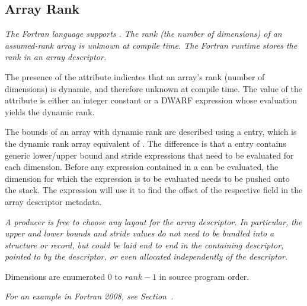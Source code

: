 \subsection{Array Rank}
\label{chap:DWATrank}
\textit{The Fortran language supports . The
  rank (the number of dimensions) of an assumed-rank array is unknown
  at compile time. The Fortran runtime stores the rank in an array
  descriptor.}

The presence of the
\hypertarget{chap:DWATrankofdynamicarray}{\DWATrankINDX}
attribute indicates that an array's rank
(number of dimensions) is dynamic, and therefore unknown at compile
time. The value of the \DWATrankDEFN{} attribute is either an integer constant
or a DWARF expression whose evaluation yields the dynamic rank.

The bounds of an array with dynamic rank are described using a
\DWTAGgenericsubrange{} entry, which  
is the dynamic rank array equivalent of
\DWTAGsubrangetype. The
difference is that a \DWTAGgenericsubrange{} entry contains generic
lower/upper bound and stride expressions that need to be evaluated for
each dimension. Before any expression contained in a
\DWTAGgenericsubrange{} can be evaluated, the dimension for which the
expression is to be evaluated needs to be pushed onto the stack. The
expression will use it to find the offset of the respective field in
the array descriptor metadata.

\textit{A producer is free to choose any layout for the
  array descriptor. In particular, the upper and lower bounds and
  stride values do not need to be bundled into a structure or record,
  but could be laid end to end in the containing descriptor, pointed
  to by the descriptor, or even allocated independently of the
  descriptor.}

Dimensions are enumerated $0$ to $\mathit{rank}-1$ in source program
order.

\textit{For an example in Fortran 2008, see
  Section~.}

